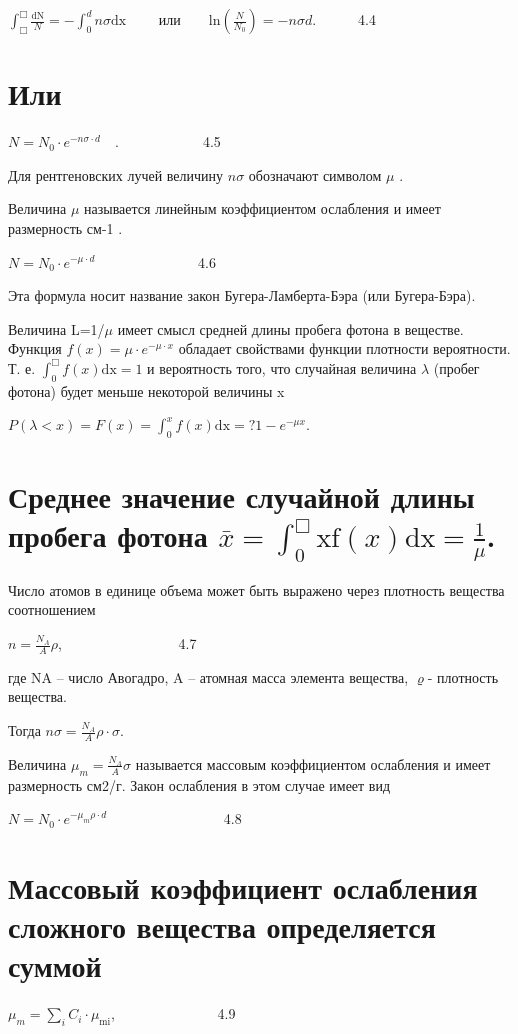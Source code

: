 \documentclass[a4paper,14pt, openany, twoside, draft]{extbook} %
\begin{document}
 $\int _{\Box }^{\Box }\frac{\text{dN}} N=-\int _0^d\mathit{n\sigma }\text{dx}$ \ \ \ \ или\ \ \ \  $\text{ln}(\frac N{N_0})=-\mathit{n\sigma d}$.\ \ \ \ \ \ 4.4

\section[Или ]{Или }
 $N=N_0{\cdot}e^{-\mathit{n\sigma }{\cdot}d}$\ \ .\ \ \ \ \ \ \ \ \ \ \ \ 4.5

Для рентгеновских лучей величину  $\mathit{n\sigma }$ обозначают символом ${\mu}$ .

Величина ${\mu}$ называется линейным коэффициентом ослабления и имеет размерность см{}-1 .

 $N=N_0{\cdot}e^{-\mu {\cdot}d}$ \ \ \ \ \ \ \ \ \ \ \ \ \ \ 4.6

Эта формула носит название закон Бугера-Ламберта-Бэра (или Бугера-Бэра).

Величина L=1/${\mu}$  имеет смысл средней длины пробега фотона в веществе. Функция  $f(x)=\mu {\cdot}e^{-\mu {\cdot}x}$ обладает свойствами функции плотности вероятности. Т. е.  $\int _0^{\Box }f(x)\text{dx}=1$ и вероятность того, что случайная величина ${\lambda}$ (пробег фотона) будет меньше некоторой величины x

 $P(\lambda <x)=F(x)=\int _0^xf(x)\text{dx}=?1-e^{-\mathit{\mu x}}$.

\section[Среднее значение \ случайной длины пробега фотона \ .]{Среднее значение  случайной длины пробега фотона   $\bar x=\int _0^{\Box }\text{xf}(x)\text{dx}=\frac 1{\mu }$.}
Число атомов в единице объема может быть выражено через плотность вещества соотношением

 $n=\frac{N_A} A\rho $, \ \ \ \ \ \ \ \ \ \ \ \ \ \ \ \ 4.7

где NA – число Авогадро, A – атомная масса элемента вещества, ${\varrho}${}- плотность вещества.\ \

Тогда   $\mathit{n\sigma }=\frac{N_A} A\rho {\cdot}\sigma $.

Величина  $\mu _m=\frac{N_A} A\sigma $ называется массовым коэффициентом ослабления и имеет размерность см2/г. Закон ослабления в этом случае имеет вид

 $N=N_0{\cdot}e^{-\mu _m\rho {\cdot}d}$ \ \ \ \ \ \ \ \ \ \ \ \ \ \ \ \ 4.8

\section[Массовый коэффициент ослабления сложного вещества определяется суммой]{Массовый коэффициент ослабления сложного вещества определяется суммой}
 $\mu _m=\sum _iC_i{\cdot}\mu _{\text{mi}}$, \ \ \ \ \ \ \ \ \ \ \ \ \ \ 4.9
\end{document}
